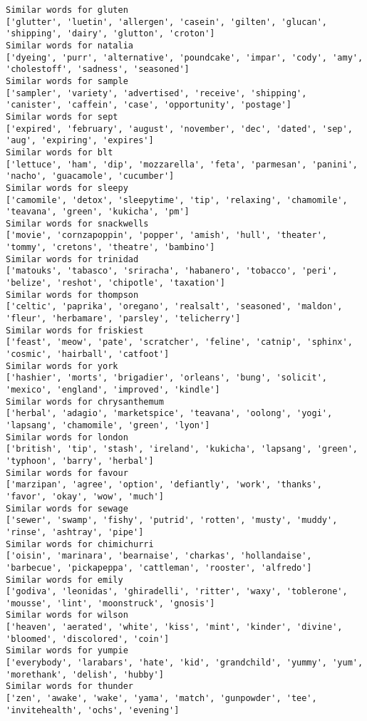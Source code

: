 \documentclass[11pt]{article}
\begin{document}
\begin{Verbatim}[commandchars=\\\{\}]
Similar words for gluten
['glutter', 'luetin', 'allergen', 'casein', 'gilten', 'glucan', 'shipping', 'dairy', 'glutton', 'croton']
Similar words for natalia
['dyeing', 'purr', 'alternative', 'poundcake', 'impar', 'cody', 'amy', 'cholestoff', 'sadness', 'seasoned']
Similar words for sample
['sampler', 'variety', 'advertised', 'receive', 'shipping', 'canister', 'caffein', 'case', 'opportunity', 'postage']
Similar words for sept
['expired', 'february', 'august', 'november', 'dec', 'dated', 'sep', 'aug', 'expiring', 'expires']
Similar words for blt
['lettuce', 'ham', 'dip', 'mozzarella', 'feta', 'parmesan', 'panini', 'nacho', 'guacamole', 'cucumber']
Similar words for sleepy
['camomile', 'detox', 'sleepytime', 'tip', 'relaxing', 'chamomile', 'teavana', 'green', 'kukicha', 'pm']
Similar words for snackwells
['movie', 'cornzapoppin', 'popper', 'amish', 'hull', 'theater', 'tommy', 'cretons', 'theatre', 'bambino']
Similar words for trinidad
['matouks', 'tabasco', 'sriracha', 'habanero', 'tobacco', 'peri', 'belize', 'reshot', 'chipotle', 'taxation']
Similar words for thompson
['celtic', 'paprika', 'oregano', 'realsalt', 'seasoned', 'maldon', 'fleur', 'herbamare', 'parsley', 'telicherry']
Similar words for friskiest
['feast', 'meow', 'pate', 'scratcher', 'feline', 'catnip', 'sphinx', 'cosmic', 'hairball', 'catfoot']
Similar words for york
['hashier', 'morts', 'brigadier', 'orleans', 'bung', 'solicit', 'mexico', 'england', 'improved', 'kindle']
Similar words for chrysanthemum
['herbal', 'adagio', 'marketspice', 'teavana', 'oolong', 'yogi', 'lapsang', 'chamomile', 'green', 'lyon']
Similar words for london
['british', 'tip', 'stash', 'ireland', 'kukicha', 'lapsang', 'green', 'typhoon', 'barry', 'herbal']
Similar words for favour
['marzipan', 'agree', 'option', 'defiantly', 'work', 'thanks', 'favor', 'okay', 'wow', 'much']
Similar words for sewage
['sewer', 'swamp', 'fishy', 'putrid', 'rotten', 'musty', 'muddy', 'rinse', 'ashtray', 'pipe']
Similar words for chimichurri
['oisin', 'marinara', 'bearnaise', 'charkas', 'hollandaise', 'barbecue', 'pickapeppa', 'cattleman', 'rooster', 'alfredo']
Similar words for emily
['godiva', 'leonidas', 'ghiradelli', 'ritter', 'waxy', 'toblerone', 'mousse', 'lint', 'moonstruck', 'gnosis']
Similar words for wilson
['heaven', 'aerated', 'white', 'kiss', 'mint', 'kinder', 'divine', 'bloomed', 'discolored', 'coin']
Similar words for yumpie
['everybody', 'larabars', 'hate', 'kid', 'grandchild', 'yummy', 'yum', 'morethank', 'delish', 'hubby']
Similar words for thunder
['zen', 'awake', 'wake', 'yama', 'match', 'gunpowder', 'tee', 'invitehealth', 'ochs', 'evening']

\end{Verbatim}
\end{document}
